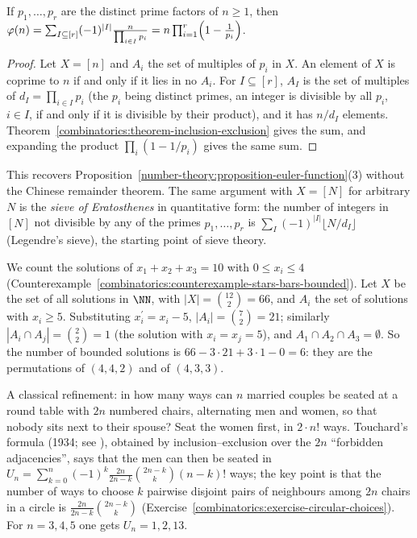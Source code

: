 \begin{proposition}\label{combinatorics:proposition-euler-inclusion-exclusion}
If $p_1, \ldots, p_r$ are the distinct prime factors of $n \geq 1$, then
$\varphi(n) = \sum_{I \subseteq [r]}(-1)^{|I|}\frac{n}{\prod_{i \in I}p_i} = n\prod_{i=1}^{r}\Bigl(1 - \frac{1}{p_i}\Bigr)$.
\end{proposition}

\begin{proof}
Let $X = [n]$ and $A_i$ the set of multiples of $p_i$ in $X$. An element of $X$ is coprime to $n$ if and only if it lies in no $A_i$. For $I \subseteq [r]$, $A_I$ is the set of multiples of
$d_I = \prod_{i \in I}p_i$ (the $p_i$ being distinct primes, an integer is divisible by all $p_i$, $i \in I$, if and only if it is divisible by their product), and it has $n/d_I$ elements. Theorem~\ref{combinatorics:theorem-inclusion-exclusion}
gives the sum, and expanding the product $\prod_i(1 - 1/p_i)$ gives the same sum.
\end{proof}

This recovers Proposition~\ref{number-theory:proposition-euler-function}(3) without the Chinese remainder theorem. The same argument with $X = [N]$ for arbitrary $N$ is the \emph{sieve of Eratosthenes}
in quantitative form: the number of integers in $[N]$ not divisible by any of the primes $p_1, \ldots, p_r$ is $\sum_{I}(-1)^{|I|}\lfloor N/d_I \rfloor$ (Legendre's sieve), the starting point of sieve
theory.

\begin{example}\label{combinatorics:example-bounded-solutions}
We count the solutions of $x_1 + x_2 + x_3 = 10$ with $0 \leq x_i \leq 4$ (Counterexample~\ref{combinatorics:counterexample-stars-bars-bounded}). Let $X$ be the set of all solutions in $\NN$, with
$|X| = \binom{12}{2} = 66$, and $A_i$ the set of solutions with $x_i \geq 5$. Substituting $x_i^{\prime} = x_i - 5$, $|A_i| = \binom{7}{2} = 21$; similarly $|A_i \cap A_j| = \binom{2}{2} = 1$ (the solution
with $x_i = x_j = 5$), and $A_1 \cap A_2 \cap A_3 = \emptyset$. So the number of bounded solutions is $66 - 3 \cdot 21 + 3 \cdot 1 - 0 = 6$: they are the permutations of $(4, 4, 2)$ and of $(4, 3, 3)$.
\end{example}

\begin{example}\label{combinatorics:example-menages}
A classical refinement: in how many ways can $n$ married couples be seated at a round table with $2n$ numbered chairs, alternating men and women, so that nobody sits next to their spouse? Seat the women
first, in $2 \cdot n!$ ways. Touchard's formula (1934; see \cite{van-lint-wilson}), obtained by inclusion--exclusion over the $2n$ ``forbidden adjacencies'', says that the men can then be seated in
$U_n = \sum_{k=0}^{n}(-1)^k\frac{2n}{2n - k}\binom{2n - k}{k}(n - k)!$ ways; the key point is that the number of ways to choose $k$ pairwise disjoint pairs of neighbours among $2n$ chairs in a circle is
$\frac{2n}{2n-k}\binom{2n-k}{k}$ (Exercise~\ref{combinatorics:exercise-circular-choices}). For $n = 3, 4, 5$ one gets $U_n = 1, 2, 13$.
\end{example}

